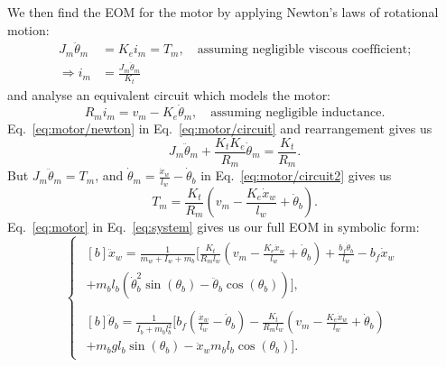\documentclass[11pt]{article} %
\begin{document}
We then find the \ac{EOM} for the motor by applying Newton's laws of rotational motion:
\begin{align}
  J_m \ddot{\theta}_m &= K_e i_m = T_m, \quad \text{assuming negligible viscous coefficient;}\nonumber \\
  \Rightarrow i_m &= \frac{J_m \ddot{\theta}_m}{K_t}\label{eq:motor/newton}
\end{align}
and analyse an equivalent circuit which models the motor:
\begin{equation}\label{eq:motor/circuit}
R_m i_m = v_m - K_e \dot{\theta}_m, \quad \text{assuming negligible inductance.}
\end{equation}
Eq.~\eqref{eq:motor/newton} in Eq.~\eqref{eq:motor/circuit} and rearrangement gives us
\begin{equation}\label{eq:motor/circuit2}
  J_m \ddot{\theta}_m
  + \frac{K_t K_e}{R_m} \dot{\theta}_m
  = \frac{K_t}{R_m}.
\end{equation}
But $J_m \ddot{\theta}_m = T_m$, and $\dot{\theta}_m = \frac{\dot{x}_w}{l_w} - \dot{\theta}_b$ in Eq.~\eqref{eq:motor/circuit2} gives us
\begin{equation}\label{eq:motor}
  T_m = \frac{K_t}{R_m}\left(
    v_m
    - \frac{K_e \dot{x}_w}{l_w}
    + \dot{\theta}_b
  \right).
\end{equation}
Eq.~\eqref{eq:motor} in Eq.~\eqref{eq:system} gives us our full \ac{EOM} in symbolic form:
\begin{equation}\label{eq:system-nonlinear}
  \begin{cases}
    \begin{aligned}[b]
      \ddot{x}_w =
      \frac{1}{m_w + I_w + m_b}\bigg[
      \frac{K_t}{R_m l_w}\left(
        v_m
        - \frac{K_e \dot{x}_w}{l_w}
        + \dot{\theta}_b
      \right)
      + \frac{b_f \dot{\theta}_b}{l_w}
      - b_f \dot{x}_w\\
      + m_b l_b \left(
        \dot{\theta}^2_b \sin(\theta_b)
        - \ddot{\theta}_b \cos(\theta_b)
      \right)
      \bigg],
    \end{aligned}\\[1em]
  \begin{aligned}[b]
    \ddot{\theta}_b =
    \frac{1}{I_b + m_b l_b^2}\bigg[
      b_f\left(
        \frac{\dot{x}_w}{l_w}
        - \dot{\theta}_b
      \right)
      - \frac{K_t}{R_m l_w}\left(
        v_m
        - \frac{K_e \dot{x}_w}{l_w}
        + \dot{\theta}_b
      \right)\\
      + m_b g l_b \sin(\theta_b)
      - \ddot{x}_w m_b l_b \cos(\theta_b)
    \bigg].
    \end{aligned}
  \end{cases}
\end{equation}
\end{document}
